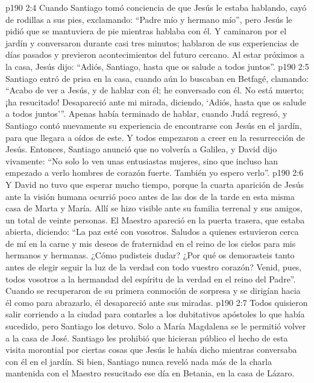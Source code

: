 \vs p190 2:4 Cuando Santiago tomó conciencia de que Jesús le estaba hablando, cayó de rodillas a sus pies, exclamando: “Padre mío y hermano mío”, pero Jesús le pidió que se mantuviera de pie mientras hablaba con él. Y caminaron por el jardín y conversaron durante casi tres minutos; hablaron de sus experiencias de días pasados y previeron acontecimientos del futuro cercano. Al estar próximos a la casa, Jesús dijo: “Adiós, Santiago, hasta que os salude a todos juntos”.
\vs p190 2:5 Santiago entró de prisa en la casa, cuando aún lo buscaban en Betfagé, clamando: “Acabo de ver a Jesús, y de hablar con él; he conversado con él. No está muerto; ¡ha resucitado! Desapareció ante mi mirada, diciendo, ‘Adiós, hasta que os salude a todos juntos’”. Apenas había terminado de hablar, cuando Judá regresó, y Santiago contó nuevamente su experiencia de encontrarse con Jesús en el jardín, para que llegara a oídos de este. Y todos empezaron a creer en la resurrección de Jesús. Entonces, Santiago anunció que no volvería a Galilea, y David dijo vivamente: “No solo lo ven unas entusiastas mujeres, sino que incluso han empezado a verlo hombres de corazón fuerte. También yo espero verlo”.
\vs p190 2:6 \pc Y David no tuvo que esperar mucho tiempo, porque la cuarta aparición de Jesús ante la visión humana ocurrió poco antes de las dos de la tarde en esta misma casa de Marta y María. Allí se hizo visible ante su familia terrenal y sus amigos, un total de veinte personas. El Maestro apareció en la puerta trasera, que estaba abierta, diciendo: “La paz esté con vosotros. Saludos a quienes estuvieron cerca de mí en la carne y mis deseos de fraternidad en el reino de los cielos para mis hermanos y hermanas. ¿Cómo pudisteis dudar? ¿Por qué os demorasteis tanto antes de elegir seguir la luz de la verdad con todo vuestro corazón? Venid, pues, todos vosotros a la hermandad del espíritu de la verdad en el reino del Padre”. Cuando se recuperaron de su primera conmoción de sorpresa y se dirigían hacia él como para abrazarlo, él desapareció ante sus miradas.
\vs p190 2:7 \pc Todos quisieron salir corriendo a la ciudad para contarles a los dubitativos apóstoles lo que había sucedido, pero Santiago los detuvo. Solo a María Magdalena se le permitió volver a la casa de José. Santiago les prohibió que hicieran público el hecho de esta visita morontial por ciertas cosas que Jesús le había dicho mientras conversaba con él en el jardín. Si bien, Santiago nunca reveló nada más de la charla mantenida con el Maestro resucitado ese día en Betania, en la casa de Lázaro.
